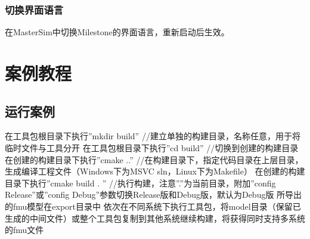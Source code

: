 \documentclass[letterpaper,10pt,english]{sphinxmanual}
\begin{document}
\subsection{切换界面语言}
\label{\detokenize{install/_u73af_u5883_u914d_u7f6e:id6}}
在MasterSim中切换Milestone的界面语言，重新启动后生效。


\chapter{案例教程}
\label{\detokenize{tutorial/index:id1}}\label{\detokenize{tutorial/index::doc}}

\section{运行案例}
\label{\detokenize{tutorial/index:id2}}
在工具包根目录下执行”mkdir build” //建立单独的构建目录，名称任意，用于将临时文件与工具分开
在工具包根目录下执行”cd build” //切换到创建的构建目录
在创建的构建目录下执行”cmake ..” //在构建目录下，指定代码目录在上层目录，生成编译工程文件（Windows下为MSVC sln，Linux下为Makefile）
在创建的构建目录下执行”cmake \textendash{}build . ” //执行构建，注意”.”为当前目录，附加”\textendash{}config Release”或”\textendash{}config Debug”参数切换Release版和Debug版，默认为Debug版
所导出的fmu模型在export目录中
依次在不同系统下执行工具包，将model目录（保留已生成的中间文件）或整个工具包复制到其他系统继续构建，将获得同时支持多系统的fmu文件
\end{document}
